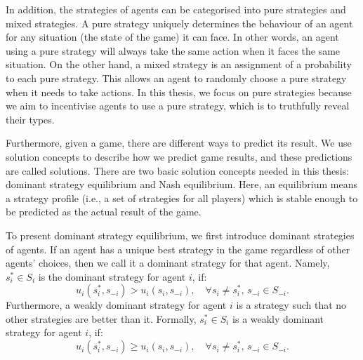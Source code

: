 \documentclass[11pt]{phdthesis}
\begin{document}
In addition, the strategies of agents can be categorised into pure strategies and mixed strategies. A pure strategy uniquely determines the behaviour of an agent for any situation (the state of the game) it can face. In other words, an agent using a pure strategy will always take the same action when it faces the same situation. On the other hand, a mixed strategy is an assignment of a probability to each pure strategy. This allows an agent to randomly choose a pure strategy when it needs to take actions. In this thesis, we focus on pure strategies because we aim to incentivise agents to use a pure strategy, which is to truthfully reveal their types.



Furthermore, given a game, there are different ways to predict its result. We use solution concepts to describe how we predict game results, and these predictions are called solutions. There are two basic solution concepts needed in this thesis: dominant strategy equilibrium and Nash equilibrium. Here, an equilibrium means a strategy profile (i.e., a set of strategies for all players) which is stable enough to be predicted as the actual result of the game. 

To present dominant strategy equilibrium, we first introduce dominant strategies of agents. If an agent has a unique best strategy in the game regardless of other agents' choices, then we call it a dominant strategy for that agent. Namely, $s_i^* \in S_i$ is the dominant strategy for agent $i$, if: \[u_i(s_i^*,s_{-i}) > u_i(s_i,s_{-i}),\quad  \forall s_i \neq s_i^* ,\,  s_{-i} \in S_{-i}.\]
Furthermore, a weakly dominant strategy for agent $i$ is a strategy such that no other strategies are better than it. Formally, $s_i^* \in S_i$ is a weakly dominant strategy for agent $i$, if: 
\[u_i(s_i^*,s_{-i}) \geq u_i(s_i,s_{-i}),\quad \forall s_i \neq s_i^* ,\,  s_{-i} \in S_{-i}.\] 
\end{document}
